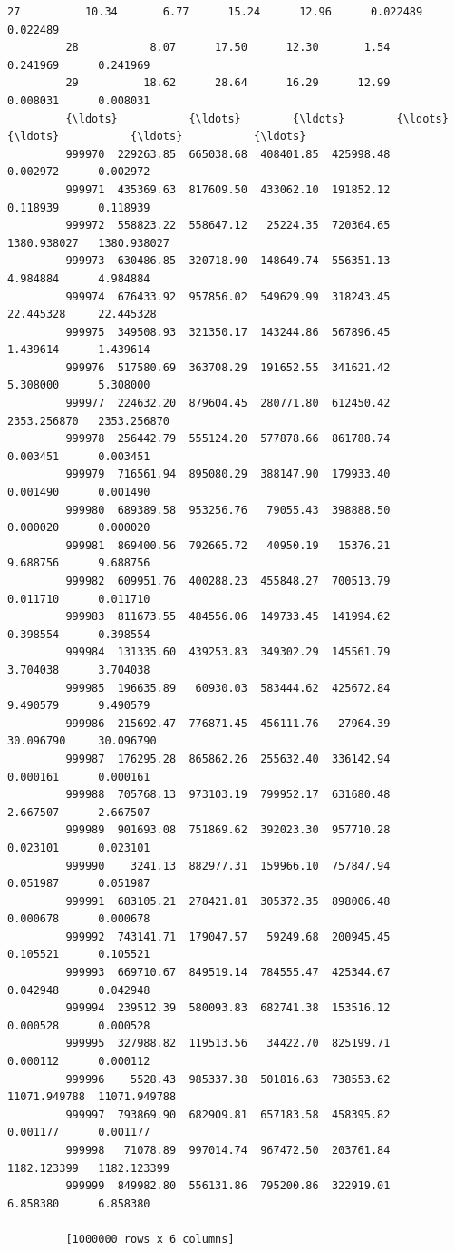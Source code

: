 \documentclass[11pt]{article}
\begin{document}
\begin{Verbatim}[commandchars=\\\{\}]
         27          10.34       6.77      15.24      12.96      0.022489      0.022489
         28           8.07      17.50      12.30       1.54      0.241969      0.241969
         29          18.62      28.64      16.29      12.99      0.008031      0.008031
         {\ldots}           {\ldots}        {\ldots}        {\ldots}        {\ldots}           {\ldots}           {\ldots}
         999970  229263.85  665038.68  408401.85  425998.48      0.002972      0.002972
         999971  435369.63  817609.50  433062.10  191852.12      0.118939      0.118939
         999972  558823.22  558647.12   25224.35  720364.65   1380.938027   1380.938027
         999973  630486.85  320718.90  148649.74  556351.13      4.984884      4.984884
         999974  676433.92  957856.02  549629.99  318243.45     22.445328     22.445328
         999975  349508.93  321350.17  143244.86  567896.45      1.439614      1.439614
         999976  517580.69  363708.29  191652.55  341621.42      5.308000      5.308000
         999977  224632.20  879604.45  280771.80  612450.42   2353.256870   2353.256870
         999978  256442.79  555124.20  577878.66  861788.74      0.003451      0.003451
         999979  716561.94  895080.29  388147.90  179933.40      0.001490      0.001490
         999980  689389.58  953256.76   79055.43  398888.50      0.000020      0.000020
         999981  869400.56  792665.72   40950.19   15376.21      9.688756      9.688756
         999982  609951.76  400288.23  455848.27  700513.79      0.011710      0.011710
         999983  811673.55  484556.06  149733.45  141994.62      0.398554      0.398554
         999984  131335.60  439253.83  349302.29  145561.79      3.704038      3.704038
         999985  196635.89   60930.03  583444.62  425672.84      9.490579      9.490579
         999986  215692.47  776871.45  456111.76   27964.39     30.096790     30.096790
         999987  176295.28  865862.26  255632.40  336142.94      0.000161      0.000161
         999988  705768.13  973103.19  799952.17  631680.48      2.667507      2.667507
         999989  901693.08  751869.62  392023.30  957710.28      0.023101      0.023101
         999990    3241.13  882977.31  159966.10  757847.94      0.051987      0.051987
         999991  683105.21  278421.81  305372.35  898006.48      0.000678      0.000678
         999992  743141.71  179047.57   59249.68  200945.45      0.105521      0.105521
         999993  669710.67  849519.14  784555.47  425344.67      0.042948      0.042948
         999994  239512.39  580093.83  682741.38  153516.12      0.000528      0.000528
         999995  327988.82  119513.56   34422.70  825199.71      0.000112      0.000112
         999996    5528.43  985337.38  501816.63  738553.62  11071.949788  11071.949788
         999997  793869.90  682909.81  657183.58  458395.82      0.001177      0.001177
         999998   71078.89  997014.74  967472.50  203761.84   1182.123399   1182.123399
         999999  849982.80  556131.86  795200.86  322919.01      6.858380      6.858380
         
         [1000000 rows x 6 columns]
\end{Verbatim}
            
\end{document}
